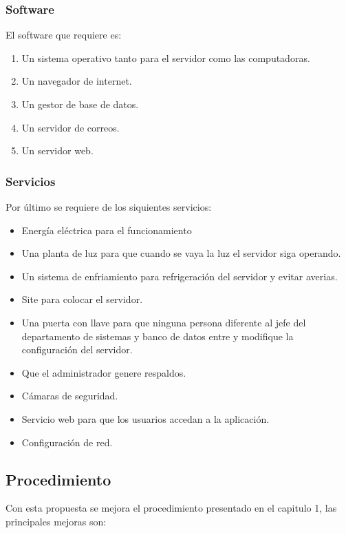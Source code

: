 \subsubsection{Software}
El software que requiere es: 
\begin{enumerate}
	\item Un sistema operativo tanto para el servidor como las computadoras.
	\item Un navegador de internet.
	\item Un gestor de base de datos.
	\item Un servidor de correos.
	\item Un servidor web.
\end{enumerate}
\subsubsection{Servicios}

Por último se requiere de los siquientes servicios: 
\begin{itemize}
	\item Energía eléctrica para el funcionamiento
	\item Una planta de luz para que cuando se vaya la luz el servidor siga operando.
	\item Un sistema de enfriamiento para refrigeración del servidor y evitar averias.
	\item Site para colocar el servidor.
	\item Una puerta con llave para que ninguna persona diferente al jefe del departamento de sistemas y banco de datos entre y modifique la configuración del servidor.
	\item Que el administrador genere respaldos.
	\item Cámaras de seguridad. 
	\item Servicio web para que los usuarios accedan a la aplicación. 
	\item Configuración de red.
\end{itemize} 

\subsection{Procedimiento}
Con esta propuesta se mejora el procedimiento presentado en el capitulo 1, las principales mejoras son:

